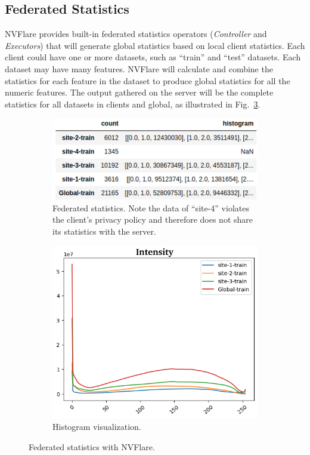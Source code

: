 \documentclass[11pt]{article}
\begin{document}
\subsection{Federated Statistics} NVFlare provides built-in federated statistics operators (\textit{Controller} and \textit{Executors}) that will generate global statistics based on local client statistics. 
Each client could have one or more datasets, such as ``train'' and ``test'' datasets. Each dataset may have many features.
NVFlare will calculate and combine the statistics for each feature in the dataset to produce global statistics for all the numeric features. The output gathered on the server will be the complete statistics for all datasets in clients and global, as illustrated in Fig.~\ref{fig:fedstats}.
%
\begin{figure}[htbp]
\centering
\begin{subfigure}[c]{0.55\textwidth}
    \includegraphics[width=\textwidth]{fig/covid_stats.png}
    \caption{\footnotesize Federated statistics. Note the data of ``site-4'' violates the client's privacy policy and therefore does not share its statistics with the server. \label{fig:fedstats_table}}
\end{subfigure}\qquad
\begin{subfigure}[c]{0.35\textwidth}
    \includegraphics[width=\textwidth]{fig/covid_hist.png}
    \caption{\footnotesize Histogram visualization. \label{fig:fedstats_histo}}
\end{subfigure}
\caption{Federated statistics with NVFlare. \label{fig:fedstats}}
\end{figure}
\end{document}
